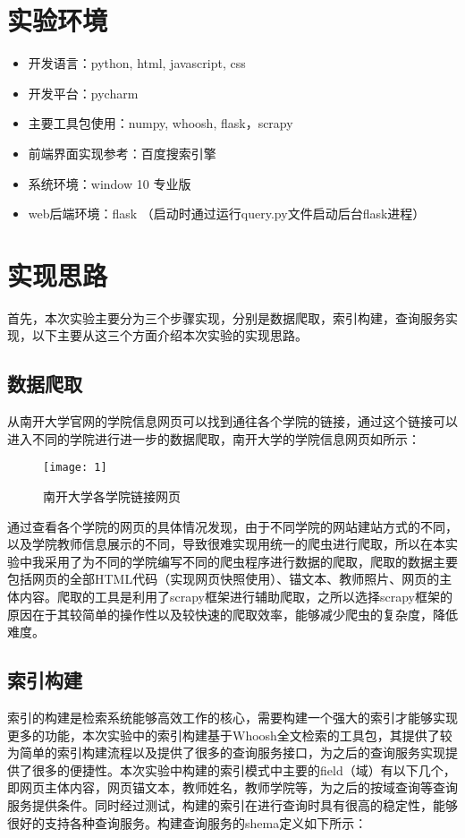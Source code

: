 \documentclass[lang=cn,11pt]{elegantpaper}
\begin{document}
\section{实验环境}

\begin{itemize}
	\item 开发语言：python, html, javascript, css
	\item 开发平台：pycharm
	\item 主要工具包使用：numpy, whoosh, flask，scrapy
	\item 前端界面实现参考：百度搜索引擎
	\item 系统环境：window 10 专业版
	\item web后端环境：flask （启动时通过运行query.py文件启动后台flask进程）
\end{itemize}

\section{实现思路}
首先，本次实验主要分为三个步骤实现，分别是数据爬取，索引构建，查询服务实现，以下主要从这三个方面介绍本次实验的实现思路。

\subsection{数据爬取}
从南开大学官网的学院信息网页可以找到通往各个学院的链接，通过这个链接可以进入不同的学院进行进一步的数据爬取，南开大学的学院信息网页如所示：


\begin{figure}[htbp]
	\centering
	\texttt{[image: 1]}
	\caption{南开大学各学院链接网页 \label{fig:1}}
\end{figure}

通过查看各个学院的网页的具体情况发现，由于不同学院的网站建站方式的不同，以及学院教师信息展示的不同，导致很难实现用统一的爬虫进行爬取，所以在本实验中我采用了为不同的学院编写不同的爬虫程序进行数据的爬取，爬取的数据主要包括网页的全部HTML代码（实现网页快照使用）、锚文本、教师照片、网页的主体内容。爬取的工具是利用了scrapy框架进行辅助爬取，之所以选择scrapy框架的原因在于其较简单的操作性以及较快速的爬取效率，能够减少爬虫的复杂度，降低难度。

\subsection{索引构建}

索引的构建是检索系统能够高效工作的核心，需要构建一个强大的索引才能够实现更多的功能，本次实验中的索引构建基于Whoosh全文检索的工具包，其提供了较为简单的索引构建流程以及提供了很多的查询服务接口，为之后的查询服务实现提供了很多的便捷性。本次实验中构建的索引模式中主要的field（域）有以下几个，即网页主体内容，网页锚文本，教师姓名，教师学院等，为之后的按域查询等查询服务提供条件。同时经过测试，构建的索引在进行查询时具有很高的稳定性，能够很好的支持各种查询服务。构建查询服务的shema定义如下所示：
\end{document}
